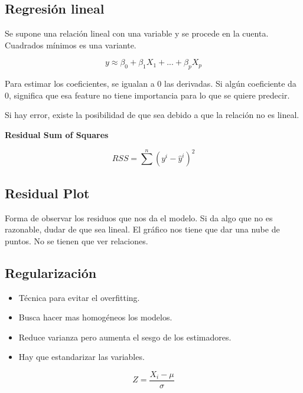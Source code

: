 \documentclass[titlepage,a4paper]{article}
\begin{document}

\subsection{Regresión lineal}
Se supone una relación lineal con una variable y se procede en la cuenta. Cuadrados mínimos es una variante.

\begin{equation}
    y \approx \beta_0 + \beta_1 X_1 + ... + \beta_p X_p
\end{equation}

Para estimar los coeficientes, se igualan a 0 las derivadas. Si algún coeficiente da 0, significa que esa feature no tiene importancia para lo que se quiere predecir.

Si hay error, existe la posibilidad de que sea debido a que la relación no es lineal.

\textbf{Residual Sum of Squares}

\begin{equation}
    RSS = \sum^{n} (y^{i}-\hat{y}^{i})^{2}
\end{equation}


\subsection{Residual Plot}

Forma de observar los residuos que nos da el modelo. Si da algo que no es razonable, dudar de que sea lineal. El gráfico nos tiene que dar una nube de puntos. No se tienen que ver relaciones.



\subsection{Regularización} \label{regularizaciones}
\begin{itemize}
    \item Técnica para evitar el overfitting.
    \item Busca hacer mas homogéneos los modelos.
    \item Reduce varianza pero aumenta el sesgo de los estimadores.
    \item Hay que estandarizar las variables.
\end{itemize}

\begin{equation}
    Z = \frac{X_i - \mu}{\sigma}
\end{equation}
\end{document}
